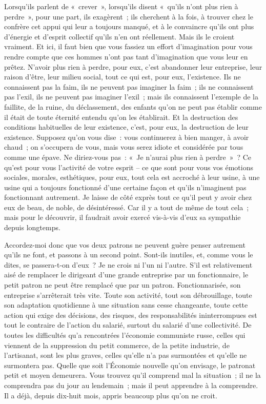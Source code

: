 \documentclass[french,twoside]{book} %
\begin{document}
Lorsqu'ils parlent de « crever », lorsqu'ils disent « qu'ils n'ont plus rien à perdre », pour une part, ils exagèrent ; ils cherchent à la fois, à trouver chez le confrère cet appui qui leur a toujours manqué, et à le convaincre qu'ils ont plus d'énergie et d'esprit collectif qu'ils n'en ont réellement. Mais ils le croient vraiment. Et ici, il faut bien que vous fassiez un effort d'imagination pour vous rendre compte que ces hommes n'ont pas tant d'imagination que vous leur en prêtez. N'avoir plus rien à perdre, pour eux, c'est abandonner leur entreprise, leur raison d'être, leur milieu social, tout ce qui est, pour eux, l'existence. Ils ne connaissent pas la faim, ils ne peuvent pas imaginer la faim ; ils ne connaissent pas l'exil, ils ne peuvent pas imaginer l'exil ; mais ils connaissent l'exemple de la faillite, de la ruine, du déclassement, des enfants qu'on ne peut pas établir comme il était de toute éternité entendu qu'on les établirait. Et la destruction des conditions habituelles de leur existence, c'est, pour eux, la destruction de leur existence. Supposez qu'on vous dise : vous continuerez à bien manger, à avoir chaud ; on s'occupera de vous, mais vous serez idiote et considérée par tous comme une épave. Ne diriez-vous pas : « Je n'aurai plus rien à perdre » ? Ce qu'est pour vous l'activité de votre esprit – ce que sont pour vous vos émotions sociales, morales, esthétiques, pour eux, tout cela est accroché à leur usine, à une usine qui a toujours fonctionné d'une certaine façon et qu'ils n'imaginent pas fonctionnant autrement. Je laisse de côté exprès tout ce qu'il peut y avoir chez eux de beau, de noble, de désintéressé. Car il y a tout de même de tout cela ; mais pour le découvrir, il faudrait avoir exercé vis-à-vis d'eux sa sympathie depuis longtemps.\par
Accordez-moi donc que vos deux patrons ne peuvent guère penser autrement qu'ils ne font, et passons à un second point. Sont-ils inutiles, et, comme vous le dites, se passera-t-on d'eux ? Je ne crois ni l'un ni l'autre. S'il est relativement aisé de remplacer le dirigeant d'une grande entreprise par un fonctionnaire, le petit patron ne peut être remplacé que par un patron. Fonctionnarisée, son entreprise s'arrêterait très vite. Toute son activité, tout son débrouillage, toute son adaptation quotidienne à une situation sans cesse changeante, toute cette action qui exige des décisions, des risques, des responsabilités ininterrompues est tout le contraire de l'action du salarié, surtout du salarié d'une collectivité. De toutes les difficultés qu'a rencontrées l'économie communiste russe, celles qui viennent de la suppression du petit commerce, de la petite industrie, de l'artisanat, sont les plus graves, celles qu'elle n'a pas surmontées et qu'elle ne surmontera pas. Quelle que soit l'Économie nouvelle qu'on envisage, le patronat petit et moyen demeurera. Vous trouvez qu'il comprend mal la situation ; il ne la comprendra pas du jour au lendemain ; mais il peut apprendre à la comprendre. Il a déjà, depuis dix-huit mois, appris beaucoup plus qu'on ne croit.\par
\end{document}
